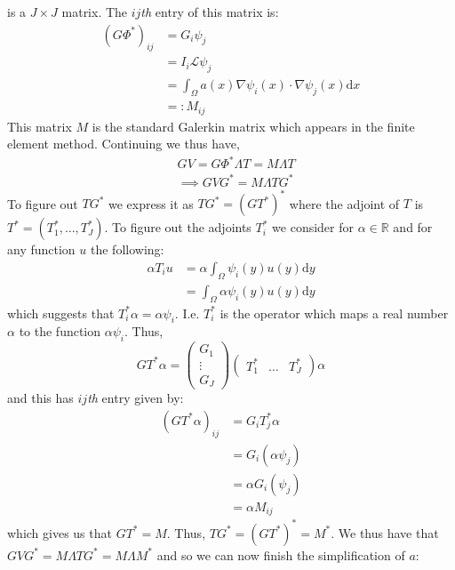is a $J\times J$ matrix. The $ij$\textit{th} entry of this matrix is:
\begin{align*}
    (G\Phi^{*})_{ij}&=G_{i}\psi_{j} \\
    &=I_{i}\mathcal{L}\psi_{j} \\
    &=\int_{\Omega}a(x)\nabla\psi_{i}(x)\cdot\nabla\psi_{j}(x)\mathrm{d}x \\
    &=:M_{ij}
\end{align*}
This matrix $M$ is the standard Galerkin matrix which appears in the finite element method. Continuing we thus have,
\begin{align*}
    &GV=G\Phi^{*}\Lambda T = M\Lambda T \\
    &\implies GVG^{*}=M\Lambda TG^{*}
\end{align*}
To figure out $TG^{*}$ we express it as $TG^{*}=(GT^{*})^{*}$ where the adjoint of $T$ is $T^{*}=(T_1^{*},\dots,T_{J}^{*})$. To figure out the adjoints $T_i^{*}$ we consider for $\alpha\in\mathbb{R}$ and for any function $u$ the following:
\begin{align*}
    \alpha T_{i}u &= \alpha\int_{\Omega}\psi_{i}(y)u(y)\mathrm{d}y \\
    &=\int_{\Omega}\alpha\psi_{i}(y)u(y)\mathrm{d}y
\end{align*}
which suggests that $T_{i}^{*}\alpha=\alpha\psi_{i}$. I.e. $T_{i}^{*}$ is the operator which maps a real number $\alpha$ to the function $\alpha\psi_{i}$. Thus,
\begin{equation*}
    GT^{*}\alpha=\begin{pmatrix}
                G_1 \\
                \vdots \\
                G_{J}
              \end{pmatrix} \begin{pmatrix}
                                T_1^{*} & \hdots & T_{J}^{*}
                            \end{pmatrix}\alpha
\end{equation*}
and this has $ij$\textit{th} entry given by:
\begin{align*}
    (GT^{*}\alpha)_{ij}&=G_{i}T_{j}^{*}\alpha \\
    &=G_{i}(\alpha\psi_{j}) \\
    &=\alpha G_{i}(\psi_{j}) \\
    &=\alpha M_{ij}
\end{align*}
which gives us that $GT^{*}=M$. Thus, $TG^{*}=(GT^{*})^{*}=M^{*}$. We thus have that $GVG^{*}=M\Lambda TG^{*}=M\Lambda M^{*}$ and so we can now finish the simplification of $a$:

